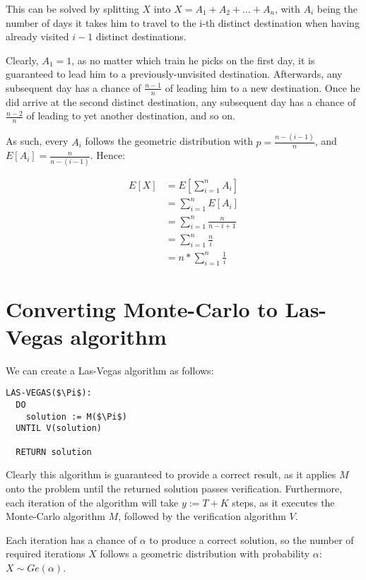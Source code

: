 \documentclass[a4paper]{scrreprt}
\begin{document}
This can be solved by splitting $X$ into $X = A_1 + A_2 + ... + A_n$, with
$A_i$ being the number of days it takes him to travel to the i-th distinct
destination when having already visited $i-1$ distinct destinations.

Clearly, $A_1 = 1$, as no matter which train he picks on the first day, it is
guaranteed to lead him to a previously-unvisited destination. Afterwards, any
subsequent day has a chance of $\frac{n-1}{n}$ of leading him to a new
destination. Once he did arrive at the second distinct destination, any
subsequent day has a chance of $\frac{n-2}{n}$ of leading to yet another
destination, and so on.

As such, every $A_i$ follows the geometric distribution with $p =
\frac{n-(i-1)}{n}$, and $E[A_i] = \frac{n}{n-(i-1)}$. Hence:

\begin{align*}
	E[X] & = E\left[\sum_{i=1}^{n}{A_i}\right] \\
	     & = \sum_{i=1}^{n}{E[A_i]} \\
	     & = \sum_{i=1}^{n}{\frac{n}{n-i+1}} \\
	     & = \sum_{i=1}^{n}{\frac{n}{i}} \\
	     & = n * \sum_{i=1}^{n}{\frac{1}{i}}
\end{align*}

\section{Converting Monte-Carlo to Las-Vegas algorithm}

We can create a Las-Vegas algorithm as follows:

\begin{lstlisting}[mathescape=true]
LAS-VEGAS($\Pi$):
  DO
    solution := M($\Pi$)
  UNTIL V(solution)

  RETURN solution
\end{lstlisting}

Clearly this algorithm is guaranteed to provide a correct result, as it applies
$M$ onto the problem until the returned solution passes verification.
Furthermore, each iteration of the algorithm will take $y := T + K$ steps, as it
executes the Monte-Carlo algorithm $M$, followed by the verification algorithm
$V$.

Each iteration has a chance of $\alpha$ to produce a correct solution, so the
number of required iterations $X$ follows a geometric distribution with
probability $\alpha$: $X \sim Ge(\alpha)$.
\end{document}
